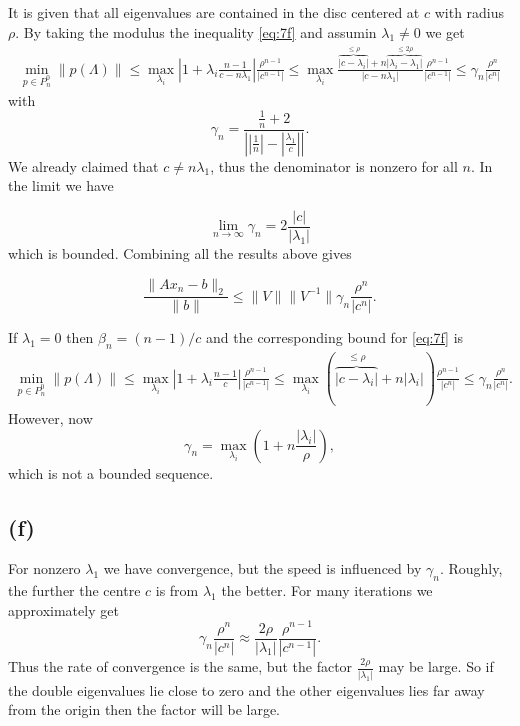 It is given that all eigenvalues are contained in the disc centered at $c$ with radius $\rho$. By taking the modulus the inequality   \eqref{eq:7f} and assumin $\lambda_{1}\neq0$ we get
\begin{align*}
\min\limits_{p\in P_{n}^{0}}\|p(\Lambda)\|\leq \max\limits_{\lambda_{i}} \left|1 + \lambda_{i} \frac{n-1}{c-n\lambda_{1}}\right|\frac{\rho^{n-1}}{|c^{n-1}|} \leq \max\limits_{\lambda_{i}}\frac{\overbrace{|c-\lambda_{i}|}^{\leq \rho} + n\overbrace{|\lambda_{i}-\lambda_{1}|}^{\leq 2\rho}}{|c-n\lambda_{1}|} \frac{\rho^{n-1}}{|c^{n-1}|}\leq \gamma_{n} \frac{\rho^{n}}{|c^{n}|}
\end{align*}
with
\begin{equation}
  \gamma_{n} =\frac{\frac{1}{n} + 2}{\left||\frac{1}{n}|-|\frac{\lambda_{1}}{c}|\right|}.
\end{equation}
We already claimed that $c\neq n\lambda_{1}$, thus the denominator is nonzero for all $n$. In the limit we have

\begin{equation}
  \lim\limits_{n\rightarrow \infty} \gamma_{n} = 2\frac{|c|}{|\lambda_{1}|}
\end{equation}
which is bounded. Combining all the results above gives

\begin{equation*}
  \frac{\|Ax_{n}-b\|_{2}}{\|b\|}\leq \|V\|\|V^{-1}\| \gamma_{n} \frac{\rho^{n}}{|c^{n}|}.
\end{equation*}

If $\lambda_{1} = 0$ then $\beta_n = (n-1)/c$ and the corresponding bound for \eqref{eq:7f} is
\begin{align*}
\min\limits_{p\in P_{n}^{0}}\|p(\Lambda)\|\leq \max\limits_{\lambda_{i}} \left|1 + \lambda_{i} \frac{n-1}{c}\right|\frac{\rho^{n-1}}{|c^{n-1}|} \leq \max\limits_{\lambda_{i}}\left(\overbrace{|c-\lambda_{i}|}^{\leq \rho} + n|\lambda_{i}|\right) \frac{\rho^{n-1}}{|c^{n}|} \leq \gamma_{n} \frac{\rho^{n}}{|c^{n}|}.
\end{align*}
However, now
\begin{equation}
\gamma_{n}  = \max\limits_{\lambda_{i}}\left(1 + n\frac{|\lambda_{i}|}{\rho}\right),
\end{equation}
which is not a bounded sequence.
\subsection*{(f)}
For nonzero $\lambda_{1}$ we have convergence, but the speed is influenced by $\gamma_{n}$. Roughly, the further the centre $c$ is from $\lambda_{1}$ the better. For many iterations we approximately get
\begin{equation}
  \gamma_{n}\frac{\rho^{n}}{|c^{n}|} \approx \frac{2\rho}{|\lambda_{1}|}\frac{\rho^{n-1}}{|c^{n-1}|}.
\end{equation}
Thus the rate of convergence is the same, but the factor $\frac{2\rho}{|\lambda_{1}|}$ may be large. So if the double eigenvalues lie close to zero and the other  eigenvalues lies far away from the origin then the factor will be large.


